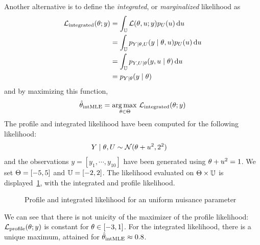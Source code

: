 \documentclass[../../Main_ManuscritThese.tex]{subfiles}
\newcommand\imgpath{/home/victor/acadwriting/Manuscrit/Text/Chapter3/img/}
\begin{document}
Another alternative is to define the \emph{integrated}, or \emph{marginalized} likelihood as
\begin{align}
  \mathcal{L}_{\mathrm{integrated}}(\theta;y) &= \int_{\mathbb{U}} \mathcal{L}(\theta,u;y) p_{U}(u) \,\mathrm{d}u \label{eq:def_int_lik}\\
                                              &=\int_{\mathbb{U}} p_{Y|\theta,U}(y \mid \theta,u) p_{U}(u) \,\mathrm{d}u \\
                                              &=\int_{\mathbb{U}} p_{Y,U|\theta}(y,u \mid \theta)\,\mathrm{d}u \\
  &= p_{Y \mid \theta}(y \mid \theta)
\end{align}
and by maximizing this function,
\begin{equation}
  \hat{\theta}_{\mathrm{intMLE}} = \operatorname*{arg\,max \,}_{\theta\in\Theta}   \mathcal{L}_{\mathrm{integrated}}(\theta;y)
\end{equation}
The profile and integrated likelihood have been computed for the following likelihood:
\begin{align}
  Y \mid \theta, U &\sim \mathcal{N}(\theta + u^2, 2^2)
\end{align}
and the observations $y = [y_1,\cdots, y_{10}]$ have been generated using $\theta+u^2=1$. We set $\Theta = [-5,5]$ and $\mathbb{U} = [-2, 2]$. The likelihood evaluated on $\Theta \times \mathbb{U}$ is displayed~\cref{fig:profile_integrated_lik}, with the integrated and profile likelihood.
\begin{figure}[ht]
  \centering
  
  \caption{\label{fig:profile_integrated_lik} Profile and integrated likelihood for an uniform nuisance parameter}
\end{figure}

We can see that there is not unicity of the maximizer of the profile likelihood: $\mathcal{L}_{\mathrm{profile}}(\theta;y)$ is constant for $\theta \in [-3, 1]$. For the integrated likelihood, there is a unique maximum, attained for $\hat{\theta}_{\mathrm{intMLE}} \approx 0.8$.
\end{document}
